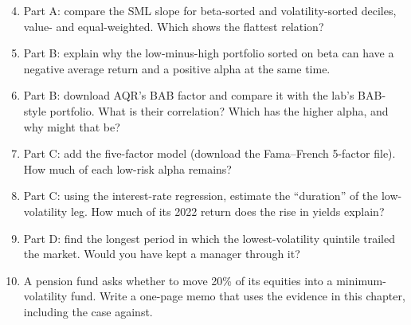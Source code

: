 \begin{enumerate}
  \setcounter{enumi}{3}
  \item Part A: compare the SML slope for beta-sorted and volatility-sorted deciles, value- and equal-weighted. Which shows the flattest relation?
  \item Part B: explain why the low-minus-high portfolio sorted on beta can have a negative average return and a positive alpha at the same time.
  \item Part B: download AQR's BAB factor and compare it with the lab's BAB-style portfolio. What is their correlation? Which has the higher alpha, and why might that be?
  \item Part C: add the five-factor model (download the Fama--French 5-factor file). How much of each low-risk alpha remains?
  \item Part C: using the interest-rate regression, estimate the ``duration'' of the low-volatility leg. How much of its 2022 return does the rise in yields explain?
  \item Part D: find the longest period in which the lowest-volatility quintile trailed the market. Would you have kept a manager through it?
  \item A pension fund asks whether to move 20\% of its equities into a minimum-volatility fund. Write a one-page memo that uses the evidence in this chapter, including the case against.
\end{enumerate}
